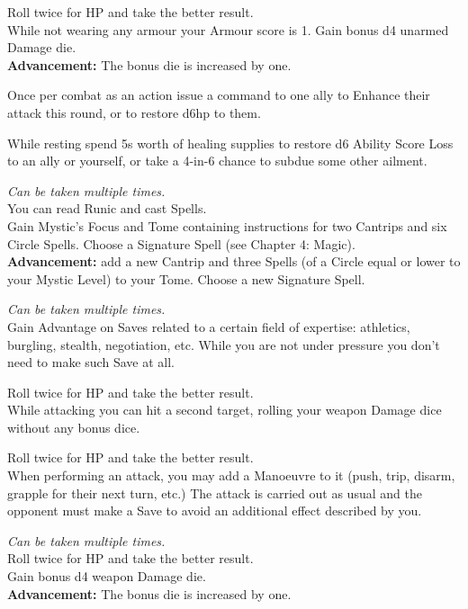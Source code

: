 \documentclass[itdr]{subfiles}
\begin{document}
 Roll twice for HP and take the better result.\\
While not wearing any armour your Armour score is 1. Gain bonus d4 unarmed Damage die.\\
\textbf{Advancement:} The bonus die is increased by one.

Once per combat as an action issue a command to one ally to Enhance their attack this round, or to restore d6hp to them.

While resting spend 5s worth of healing supplies to restore d6 Ability Score Loss to an ally or yourself, or take a 4-in-6 chance to subdue some other ailment.

 {\slshape Can be taken multiple times.}\\
You can read Runic and cast Spells.\\
Gain Mystic's Focus and Tome containing instructions for two Cantrips and six  Circle Spells. Choose a Signature Spell (see Chapter 4: Magic).\\
\textbf{Advancement:} add a new Cantrip and three Spells (of a Circle equal or lower to your Mystic Level) to your Tome. Choose a new Signature Spell.

 {\slshape Can be taken multiple times.}\\
Gain Advantage on Saves related to a certain field of expertise: athletics, burgling, stealth, negotiation, etc. While you are not under pressure you don't need to make such Save at all.

 Roll twice for HP and take the better result.\\
While attacking you can hit a second target, rolling your weapon Damage dice without any bonus dice.

 Roll twice for HP and take the better result.\\
When performing an attack, you may add a Manoeuvre to it (push, trip, disarm, grapple for their next turn, etc.) The attack is carried out as usual and the opponent must make a Save to avoid an additional effect described by you.

 {\slshape Can be taken multiple times.}\\
Roll twice for HP and take the better result.\\
Gain bonus d4 weapon Damage die.\\
\textbf{Advancement:} The bonus die is increased by one.
\end{document}
